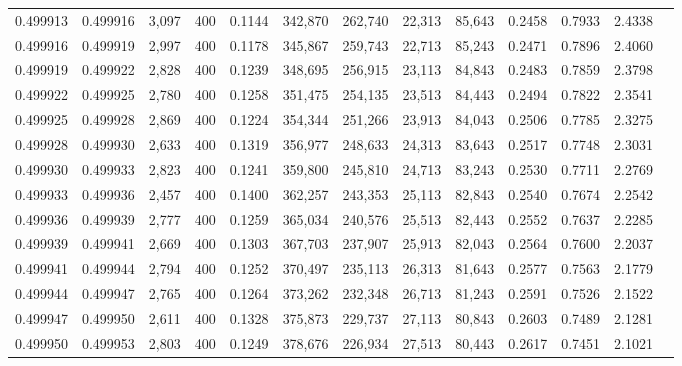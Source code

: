 \begin{tabular}{rrrrrrrrrrrrr}
0.499913 & 0.499916 &  3,097 & 400 &                                     0.1144 & 342,870 & 262,740 &  22,313 &  85,643 & 0.2458 & 0.7933 & 2.4338 \\
0.499916 & 0.499919 &  2,997 & 400 &                                     0.1178 & 345,867 & 259,743 &  22,713 &  85,243 & 0.2471 & 0.7896 & 2.4060 \\
0.499919 & 0.499922 &  2,828 & 400 &                                     0.1239 & 348,695 & 256,915 &  23,113 &  84,843 & 0.2483 & 0.7859 & 2.3798 \\
0.499922 & 0.499925 &  2,780 & 400 &                                     0.1258 & 351,475 & 254,135 &  23,513 &  84,443 & 0.2494 & 0.7822 & 2.3541 \\
0.499925 & 0.499928 &  2,869 & 400 &                                     0.1224 & 354,344 & 251,266 &  23,913 &  84,043 & 0.2506 & 0.7785 & 2.3275 \\
0.499928 & 0.499930 &  2,633 & 400 &                                     0.1319 & 356,977 & 248,633 &  24,313 &  83,643 & 0.2517 & 0.7748 & 2.3031 \\
0.499930 & 0.499933 &  2,823 & 400 &                                     0.1241 & 359,800 & 245,810 &  24,713 &  83,243 & 0.2530 & 0.7711 & 2.2769 \\
0.499933 & 0.499936 &  2,457 & 400 &                                     0.1400 & 362,257 & 243,353 &  25,113 &  82,843 & 0.2540 & 0.7674 & 2.2542 \\
0.499936 & 0.499939 &  2,777 & 400 &                                     0.1259 & 365,034 & 240,576 &  25,513 &  82,443 & 0.2552 & 0.7637 & 2.2285 \\
0.499939 & 0.499941 &  2,669 & 400 &                                     0.1303 & 367,703 & 237,907 &  25,913 &  82,043 & 0.2564 & 0.7600 & 2.2037 \\
0.499941 & 0.499944 &  2,794 & 400 &                                     0.1252 & 370,497 & 235,113 &  26,313 &  81,643 & 0.2577 & 0.7563 & 2.1779 \\
0.499944 & 0.499947 &  2,765 & 400 &                                     0.1264 & 373,262 & 232,348 &  26,713 &  81,243 & 0.2591 & 0.7526 & 2.1522 \\
0.499947 & 0.499950 &  2,611 & 400 &                                     0.1328 & 375,873 & 229,737 &  27,113 &  80,843 & 0.2603 & 0.7489 & 2.1281 \\
0.499950 & 0.499953 &  2,803 & 400 &                                     0.1249 & 378,676 & 226,934 &  27,513 &  80,443 & 0.2617 & 0.7451 & 2.1021 \\

\end{tabular}
